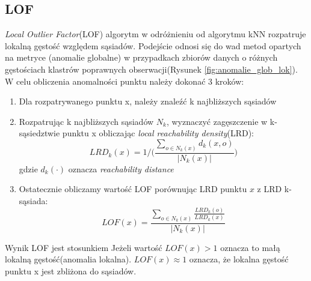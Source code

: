 \subsection{LOF}
\textit{Local Outlier Factor}(LOF) \cite{lof} algorytm w odróżnieniu od algorytmu kNN rozpatruje lokalną gęstość względem sąsiadów. Podejście odnosi się do wad metod opartych na metryce (anomalie globalne) w przypadkach zbiorów danych o różnych gęstościach klastrów poprawnych obserwacji(Rysunek \ref{fig:anomalie_glob_lok}).
W celu obliczenia anomalności punktu należy dokonać 3 kroków:
\begin{enumerate}
    \item Dla rozpatrywanego punktu x, należy znaleźć k najbliższych sąsiadów
    \item Rozpatrując k najbliższych sąsiadów $N_k$, wyznaczyć zagęszczenie w k-sąsiedztwie punktu x obliczając \textit{local reachability density}(LRD): 
    \begin{equation}
        LRD_k(x) = 1/\Bigg(\frac{ \sum\limits_{o \in N_k(x)} d_k(x,o) }{|N_k(x)|}\Bigg)
    \end{equation}
    gdzie $d_k(\cdot)$ oznacza \textit{reachability distance}
    \item Ostatecznie obliczamy wartość LOF porównując LRD punktu $x$ z LRD k-sąsiada:
    \begin{equation}
        LOF(x) = \frac{ \sum\limits_{o \in N_k(x)} \frac{LRD_k(o)}{LRD_k(x)} }{|N_k(x)|}
    \end{equation}
\end{enumerate}
Wynik LOF jest stosunkiem
Jeżeli wartość $LOF(x)>1$ oznacza to małą lokalną gęstość(anomalia lokalna). 
$LOF(x) \approx 1$ oznacza, że lokalna gęstość punktu x jest zbliżona do sąsiadów.

